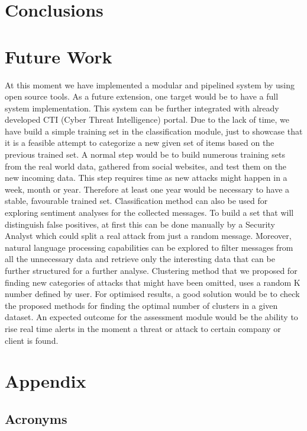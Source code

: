 \documentclass[12pt]{article}
\begin{document}
\section{Conclusions}



\newpage
\section{Future Work}

At this moment we have implemented a modular and pipelined system by using open source tools. As a future extension, one target would be to have a full system implementation. This system can be further integrated with already developed CTI (Cyber Threat Intelligence) portal. Due to the lack of time, we have build a simple training set in the classification module, just to showcase that it is a feasible attempt to categorize a new given set of items based on the previous trained set. A normal step would be to build numerous training sets from the real world data, gathered from social websites, and test them on the new incoming data. This step requires time as new attacks might happen in a week, month or year. Therefore at least one year would be necessary to have a stable, favourable trained set. Classification method can also be used for exploring sentiment analyses for the collected messages. To build a set that will distinguish false positives, at first this can be done manually by a Security Analyst which could split a real attack from just a random message. Moreover, natural language processing capabilities can be explored to filter messages from all the unnecessary data and retrieve only the interesting data that can be further structured for a further analyse. Clustering method that we proposed for finding new categories of attacks that might have been omitted, uses a random K number defined by user. For optimised results, a good solution would be to check the proposed methods for finding the optimal number of clusters in a given dataset. An expected outcome for the assessment module would be the ability to rise real time alerts in the moment a threat or attack to certain company or client is found.

\newpage
\section{Appendix}


\subsection{Acronyms}
\end{document}
